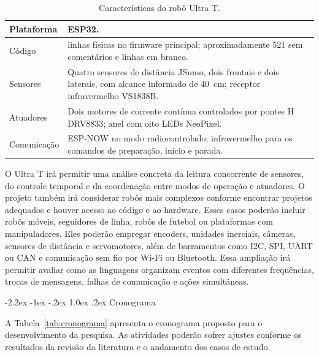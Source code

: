 \documentclass[12pt,a4paper]{article}
\makeatletter
\renewcommand\section{\@startsection{section}{1}{\z@}%
  {-2.2ex \@plus -1ex \@minus -.2ex}%
  {1.0ex \@plus .2ex}%
  {\normalfont\bfseries}}
\makeatother
\begin{document}
\begin{table}[htbp]
  \centering
  \caption{Características do robô Ultra T.}
  \label{tab:ultra-t}
  \small
  \renewcommand{\arraystretch}{1.12}
  \begin{tabularx}{\textwidth}{|>{\raggedright\arraybackslash}p{2.8cm}|>{\raggedright\arraybackslash}X|}
    \hline
    Plataforma & ESP32. \\ \hline
    Código & 720 linhas físicas no firmware principal; aproximadamente 521 sem comentários e linhas em branco. \\ \hline
    Sensores & Quatro sensores de distância JSumo, dois frontais e dois laterais, com alcance informado de 40~cm; receptor infravermelho VS1838B. \\ \hline
    Atuadores & Dois motores de corrente contínua controlados por pontes H DRV8833; anel com oito LEDs NeoPixel. \\ \hline
    Comunicação & ESP-NOW no modo radiocontrolado; infravermelho para os comandos de preparação, início e parada. \\ \hline
  \end{tabularx}
\end{table}

\FloatBarrier

O Ultra T irá permitir uma análise concreta da leitura concorrente de sensores,
do controle temporal e da coordenação entre modos de operação e atuadores.
O projeto também irá considerar robôs mais complexos conforme encontrar projetos adequados e houver acesso ao código e ao hardware.
Esses casos poderão incluir robôs móveis, seguidores de linha, robôs de futebol ou plataformas com manipuladores.
Eles poderão empregar encoders, unidades inerciais, câmeras, sensores de distância e servomotores,
além de barramentos como I2C, SPI, UART ou CAN e comunicação sem fio por Wi-Fi ou Bluetooth.
Essa ampliação irá permitir avaliar como as linguagens organizam eventos com diferentes frequências,
trocas de mensagens, falhas de comunicação e ações simultâneas.

\section{Cronograma}

A Tabela~\ref{tab:cronograma} apresenta o cronograma proposto para o desenvolvimento da pesquisa.
As atividades poderão sofrer ajustes conforme os resultados da revisão da literatura e o andamento dos casos de estudo.
\end{document}
